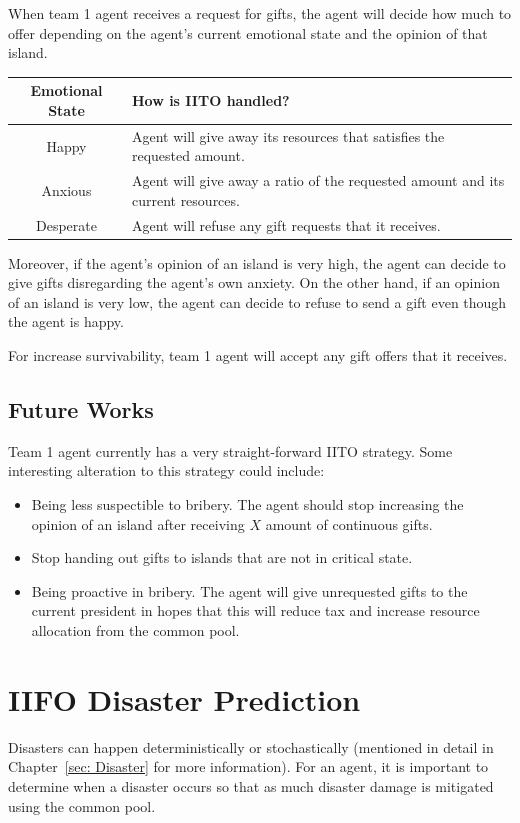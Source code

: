 When team 1 agent receives a request for gifts, the agent will decide how much to offer depending on the agent's current emotional state and the opinion of that island. 

\begin{table} [htb]
    \centering
    \begin{tabular}{|c|p{}|}
        \hline
        Emotional State & How is IITO handled? \\
        \hline
        Happy & Agent will give away its resources that satisfies the requested amount. \\
        \hline
        Anxious & Agent will give away a ratio of the requested amount and its current resources. \\
        \hline
        Desperate & Agent will refuse any gift requests that it receives. \\ 
        \hline
    \end{tabular}
\end{table}

Moreover, if the agent's opinion of an island is very high, the agent can decide to give gifts disregarding the agent's own anxiety. On the other hand, if an opinion of an island is very low, the agent can decide to refuse to send a gift even though the agent is happy. 

For increase survivability, team 1 agent will accept any gift offers that it receives. 

\subsection{Future Works}
Team 1 agent currently has a very straight-forward IITO strategy. Some interesting alteration to this strategy could include:
\begin{itemize}
    \item Being less suspectible to bribery. The agent should stop increasing the opinion of an island after receiving $X$ amount of continuous gifts.
    \item Stop handing out gifts to islands that are not in critical state.
    \item Being proactive in bribery. The agent will give unrequested gifts to the current president in hopes that this will reduce tax and increase resource allocation from the common pool. 
\end{itemize}

\section{IIFO Disaster Prediction}
Disasters can happen deterministically or stochastically (mentioned in detail in Chapter~\ref{sec: Disaster} for more information). For an agent, it is important to determine when a disaster occurs so that as much disaster damage is mitigated using the common pool. 

